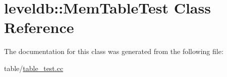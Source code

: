 \hypertarget{classleveldb_1_1_mem_table_test}{\section{leveldb\-:\-:Mem\-Table\-Test Class Reference}
\label{classleveldb_1_1_mem_table_test}
}


The documentation for this class was generated from the following file\-:\begin{DoxyCompactItemize}
\item 
table/\hyperlink{table__test_8cc}{table\-\_\-test.\-cc}\end{DoxyCompactItemize}
